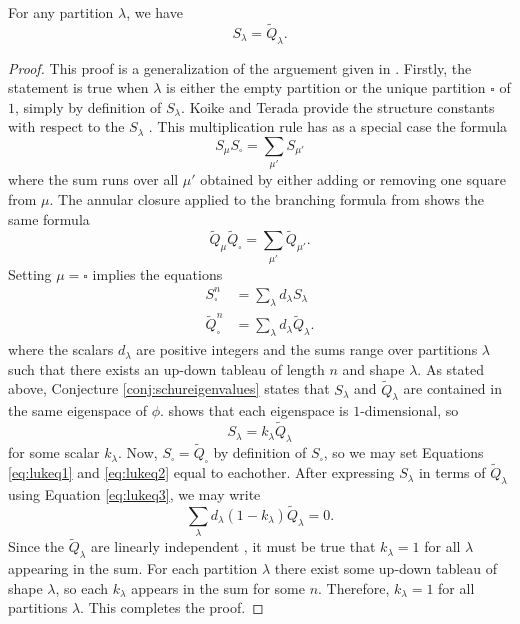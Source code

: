 \begin{corollary}
For any partition $\lambda$, we have 
\[
S_\lambda = \widetilde{Q}_\lambda.
\]
\end{corollary}
\begin{proof}
This proof is a generalization of the arguement given in \cite{Luk05}. Firstly, the statement is true when $\lambda$ is either the empty partition or the unique partition $\square$ of $1$, simply by definition of $S_\lambda$. Koike and Terada provide the structure constants with respect to the $S_\lambda$ \cite{KT87}. This multiplication rule has as a special case the formula
\begin{equation}
S_\mu S_\square = \sum_{\mu'} S_{\mu'}
\end{equation}
where the sum runs over all $\mu'$ obtained by either adding or removing one square from $\mu$. The annular closure applied to the branching formula from \cite{BB01} shows the same formula
\begin{equation}
\widetilde{Q}_\mu \widetilde{Q}_\square = \sum_{\mu'} \widetilde{Q}_{\mu'}.
\end{equation}
Setting $\mu=\square$ implies the equations
\begin{align}
S_\square^n &= \sum_\lambda d_\lambda S_\lambda \label{eq:lukeq1} \\
\widetilde{Q}_\square^n &= \sum_\lambda d_\lambda \widetilde{Q}_\lambda . \label{eq:lukeq2}
\end{align}
where the scalars $d_\lambda$ are positive integers and the sums range over partitions $\lambda$ such that there exists an up-down tableau of length $n$ and shape $\lambda$. As stated above, Conjecture \ref{conj:schureigenvalues} states that $S_\lambda$ and $\widetilde{Q}_\lambda$ are contained in the same eigenspace of $\phi$. \cite{LZ02} shows that each eigenspace is $1$-dimensional, so
\begin{equation} \label{eq:lukeq3}
S_\lambda = k_\lambda \widetilde{Q}_\lambda
\end{equation}
for some scalar $k_\lambda$. Now, $S_\square = \widetilde{Q}_\square$ by definition of $S_\square$, so we may set Equations \eqref{eq:lukeq1} and \eqref{eq:lukeq2} equal to eachother. After expressing $S_\lambda$ in terms of $\widetilde{Q}_\lambda$ using Equation \eqref{eq:lukeq3}, we may write
\begin{equation}
\sum_\lambda d_\lambda (1-k_\lambda) \widetilde{Q}_\lambda = 0.
\end{equation}
Since the $\widetilde{Q}_\lambda$ are linearly independent \cite{LZ02}, it must be true that $k_\lambda=1$ for all $\lambda$ appearing in the sum. For each partition $\lambda$ there exist some up-down tableau of shape $\lambda$, so each $k_\lambda$ appears in the sum for some $n$. Therefore, $k_\lambda=1$ for all partitions $\lambda$. This completes the proof. 
\end{proof}

